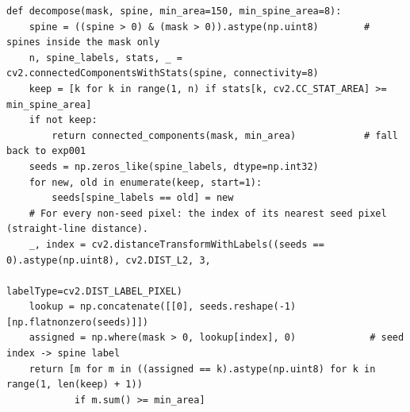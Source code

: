 \begin{lstlisting}[caption={Spine-seeded instances. Condensed from
\file{experiments/exp\_004\_spine\_tpu/src/decompose.py}.},label=lst:par-spine]
def decompose(mask, spine, min_area=150, min_spine_area=8):
    spine = ((spine > 0) & (mask > 0)).astype(np.uint8)        # spines inside the mask only
    n, spine_labels, stats, _ = cv2.connectedComponentsWithStats(spine, connectivity=8)
    keep = [k for k in range(1, n) if stats[k, cv2.CC_STAT_AREA] >= min_spine_area]
    if not keep:
        return connected_components(mask, min_area)            # fall back to exp001
    seeds = np.zeros_like(spine_labels, dtype=np.int32)
    for new, old in enumerate(keep, start=1):
        seeds[spine_labels == old] = new
    # For every non-seed pixel: the index of its nearest seed pixel (straight-line distance).
    _, index = cv2.distanceTransformWithLabels((seeds == 0).astype(np.uint8), cv2.DIST_L2, 3,
                                               labelType=cv2.DIST_LABEL_PIXEL)
    lookup = np.concatenate([[0], seeds.reshape(-1)[np.flatnonzero(seeds)]])
    assigned = np.where(mask > 0, lookup[index], 0)             # seed index -> spine label
    return [m for m in ((assigned == k).astype(np.uint8) for k in range(1, len(keep) + 1))
            if m.sum() >= min_area]
\end{lstlisting}

